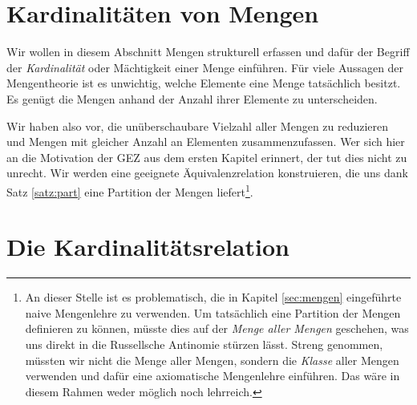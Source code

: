 \section{Kardinalitäten von Mengen}


Wir wollen in diesem Abschnitt Mengen strukturell erfassen und dafür der Begriff
der \emph{Kardinalität} oder Mächtigkeit einer Menge einführen. Für viele
Aussagen der Mengentheorie ist es unwichtig, welche Elemente eine Menge
tatsächlich besitzt. Es genügt die Mengen anhand der Anzahl ihrer Elemente zu
unterscheiden.

Wir haben also vor, die unüberschaubare Vielzahl aller Mengen zu reduzieren und
Mengen mit gleicher Anzahl an Elementen zusammenzufassen. Wer sich hier an die
Motivation der GEZ aus dem ersten Kapitel erinnert, der tut dies nicht zu
unrecht. Wir werden eine geeignete Äquivalenzrelation konstruieren, die uns dank
Satz \ref{satz:part} eine Partition der Mengen liefert\footnote{An dieser Stelle
  ist es problematisch, die in Kapitel \ref{sec:mengen} eingeführte naive
  Mengenlehre zu verwenden. Um tatsächlich eine Partition der Mengen definieren
  zu können, müsste dies auf der \emph{Menge aller Mengen} geschehen, was uns
  direkt in die Russellsche Antinomie stürzen lässt. Streng genommen, müssten
  wir nicht die Menge aller Mengen, sondern die \emph{Klasse} aller Mengen
  verwenden und dafür eine axiomatische Mengenlehre einführen. Das wäre in
  diesem Rahmen weder möglich noch lehrreich.}.


\section{Die Kardinalitätsrelation}



